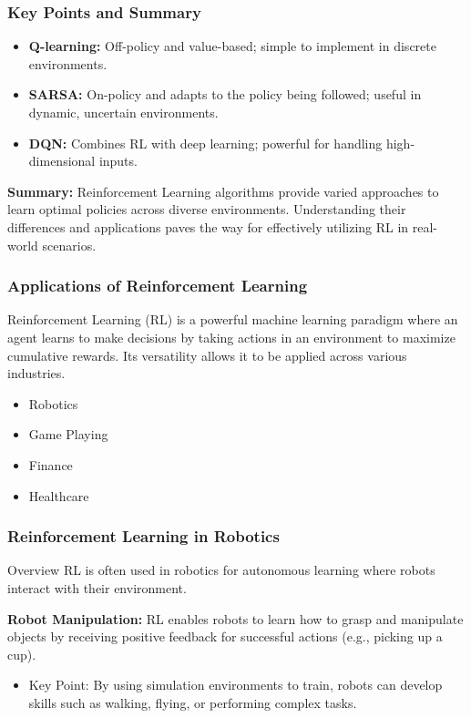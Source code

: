 \documentclass{beamer}
\begin{document}
\begin{frame}[fragile]
    \frametitle{Key Points and Summary}
    \begin{itemize}
        \item \textbf{Q-learning:} Off-policy and value-based; simple to implement in discrete environments.
        \item \textbf{SARSA:} On-policy and adapts to the policy being followed; useful in dynamic, uncertain environments.
        \item \textbf{DQN:} Combines RL with deep learning; powerful for handling high-dimensional inputs.
    \end{itemize}

    \textbf{Summary:} 
    Reinforcement Learning algorithms provide varied approaches to learn optimal policies across diverse environments. Understanding their differences and applications paves the way for effectively utilizing RL in real-world scenarios.
\end{frame}

\begin{frame}[fragile]
    \frametitle{Applications of Reinforcement Learning}
    Reinforcement Learning (RL) is a powerful machine learning paradigm where an agent learns to make decisions by taking actions in an environment to maximize cumulative rewards. Its versatility allows it to be applied across various industries.
    
    \begin{itemize}
        \item Robotics
        \item Game Playing
        \item Finance
        \item Healthcare
    \end{itemize}
\end{frame}

\begin{frame}[fragile]
    \frametitle{Reinforcement Learning in Robotics}
    \begin{block}{Overview}
        RL is often used in robotics for autonomous learning where robots interact with their environment.
    \end{block}
    
    \begin{example}
        \textbf{Robot Manipulation:} RL enables robots to learn how to grasp and manipulate objects by receiving positive feedback for successful actions (e.g., picking up a cup).
    \end{example}
    
    \begin{itemize}
        \item Key Point: By using simulation environments to train, robots can develop skills such as walking, flying, or performing complex tasks.
    \end{itemize}
\end{frame}
\end{document}
